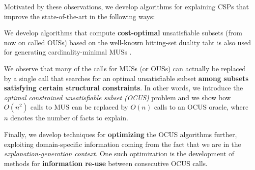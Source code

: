 Motivated by these observations, we develop algorithms for explaining CSPs that improve the state-of-the-art in the following ways: 
\begin{compactitem}
 \item We develop algorithms that compute \textbf{cost-optimal} unsatisfiable subsets (from now on called OUSs) based on the well-known hitting-set duality taht is also used for generating cardinality-minimal MUSs \cite{ignatiev2015smallest}.
\item We observe that many of the calls for MUSs (or OUSs) can actually be replaced by a single call that searches for an optimal unsatisfiable subset \textbf{among subsets satisfying certain structural constraints}. In other words, we introduce the \emph{optimal constrained unsatisfiable subset (OCUS)} problem and we show how $O(n^2)$ calls to MUS can be replaced by $O(n)$ calls to an OCUS oracle, where $n$ denotes the number of facts to explain. 
\item Finally, we develop techniques for \textbf{optimizing} the OCUS algorithms further, exploiting domain-specific information coming from the fact that we are in the  \emph{explanation-generation context}. One such optimization is the development of methods for \textbf{information re-use} between consecutive OCUS calls.
% 
% 
\end{compactitem}



